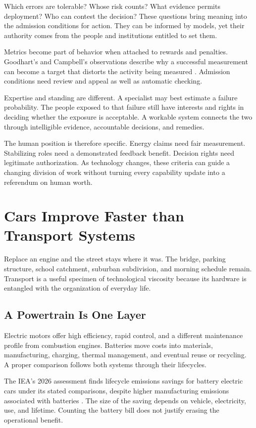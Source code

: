 \documentclass[11pt,openany]{book}
\begin{document}
Which errors are tolerable? Whose risk counts? What evidence permits deployment? Who can contest the decision? These questions bring meaning into the admission conditions for action. They can be informed by models, yet their authority comes from the people and institutions entitled to set them.

Metrics become part of behavior when attached to rewards and penalties. Goodhart's and Campbell's observations describe why a successful measurement can become a target that distorts the activity being measured \cite{goodhart1975problems,campbell1979assessing}. Admission conditions need review and appeal as well as automatic checking.

Expertise and standing are different. A specialist may best estimate a failure probability. The people exposed to that failure still have interests and rights in deciding whether the exposure is acceptable. A workable system connects the two through intelligible evidence, accountable decisions, and remedies.

The human position is therefore specific. Energy claims need fair measurement. Stabilizing roles need a demonstrated feedback benefit. Decision rights need legitimate authorization. As technology changes, these criteria can guide a changing division of work without turning every capability update into a referendum on human worth.

\section{Cars Improve Faster than Transport Systems}

Replace an engine and the street stays where it was. The bridge, parking structure, school catchment, suburban subdivision, and morning schedule remain. Transport is a useful specimen of technological viscosity because its hardware is entangled with the organization of everyday life.

\subsection{A Powertrain Is One Layer}

Electric motors offer high efficiency, rapid control, and a different maintenance profile from combustion engines. Batteries move costs into materials, manufacturing, charging, thermal management, and eventual reuse or recycling. A proper comparison follows both systems through their lifecycles.

The IEA's 2026 assessment finds lifecycle emissions savings for battery electric cars under its stated comparisons, despite higher manufacturing emissions associated with batteries \cite{iea2026evlifecycle}. The size of the saving depends on vehicle, electricity, use, and lifetime. Counting the battery bill does not justify erasing the operational benefit.
\end{document}
